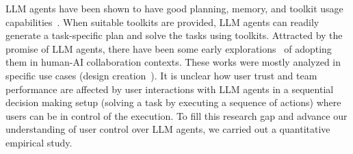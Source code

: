 LLM agents have been shown to have good planning, memory, and toolkit usage capabilities~\cite{xi2023rise, wang2024survey}. 
When suitable toolkits are provided, LLM agents can readily generate a task-specific plan and solve the tasks using toolkits. 
Attracted by the promise of LLM agents, there have been some early explorations~\cite{geissler2024concept,zheng2023synergizing,zhang2024s} of adopting them in human-AI collaboration contexts. 
These works were mostly analyzed in specific use cases (\eg design creation~\cite{geissler2024concept}). 
It is unclear how user trust and team performance are affected by user interactions with LLM agents in a sequential decision making setup (\ie solving a task by executing a sequence of actions) where users can be in control of the execution. %
To fill this research gap and advance our understanding of user control over LLM agents, we carried out a quantitative empirical study. %






